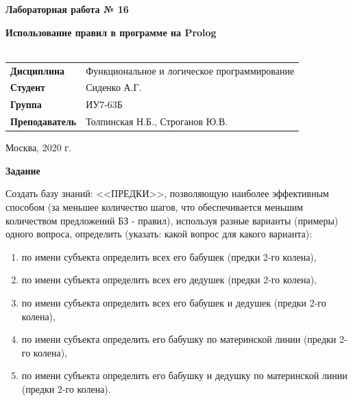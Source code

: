\documentclass[a4paper,14pt]{extreport} %
\begin{document}
\begin{titlepage}
    \vspace{4cm}

    \begin{center}
        \textbf{Лабораторная работа № 16} \\ 
        \hfill
        
        \textbf{Использование правил в программе на Prolog} \\
        \vspace{0.5cm}
        \textbf{} \\
    \end{center}

    \vspace{4cm}

    \begin{flushleft}
        \begin{tabular}{ll}
            \textbf{Дисциплина} & Функциональное и логическое программирование \\
            \textbf{Студент} & Сиденко А.Г. \\
            \textbf{Группа} & ИУ7-63Б \\
            \textbf{Преподаватель} & Толпинская Н.Б., Строганов Ю.В.  \\
        \end{tabular}
    \end{flushleft}

    \vspace{4cm}

   \begin{center}
        Москва, 2020 г.
    \end{center}

\end{titlepage}

\textbf{Задание}

Создать базу знаний: <<ПРЕДКИ>>, позволяющую наиболее эффективным способом (за меньшее количество шагов, что обеспечивается меньшим количеством предложений БЗ - правил), используя разные варианты (примеры) одного вопроса, определить (указать: какой вопрос для какого варианта):
\begin{enumerate}
\item по имени субъекта определить всех его бабушек (предки 2-го колена),
\item по имени субъекта определить всех его дедушек (предки 2-го колена),
\item по имени субъекта определить всех его бабушек и дедушек (предки 2-го колена),
\item по имени субъекта определить его бабушку по материнской линии (предки 2-го колена),
\item по имени субъекта определить его бабушку и дедушку по материнской линии (предки 2-го колена).
\end{enumerate}
\end{document}
